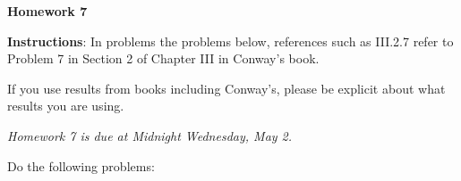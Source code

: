 \documentclass{article}%
\begin{document}
\begin{center}

\textbf{Homework 7}\bigskip

\end{center}



\noindent\textbf{Instructions}:
\noindent In problems the problems below, references such as III.2.7 refer to Problem 7 in Section 2 of Chapter III in Conway's book.\smallskip



\noindent If you use results from books including Conway's, please be explicit about what results you are using.






\begin{center}

\emph{Homework 7 is due at Midnight Wednesday, May 2.}

\end{center} 

\medskip

Do the following problems:
\end{document}
